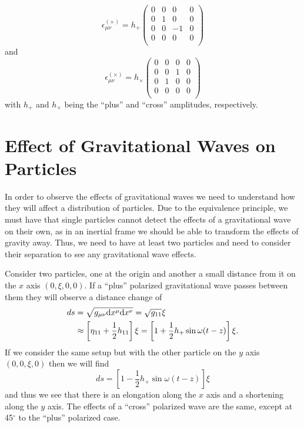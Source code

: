 \begin{equation} \label{epsilonplus}
	\epsilon^{(+)}_{\mu \nu} = h_{+}
	\begin{pmatrix}
	0 & 0 & 0 & 0 \\
	0 & 1 & 0 & 0 \\
	0 & 0 & -1 & 0 \\
	0 & 0 & 0 & 0 \\
	\end{pmatrix}
\end{equation}
and
\begin{equation} \label{epsilontimes}
	\epsilon^{(\times)}_{\mu \nu} = h_{\times}
	\begin{pmatrix}
	0 & 0 & 0 & 0 \\
	0 & 0 & 1 & 0 \\
	0 & 1 & 0 & 0 \\
	0 & 0 & 0 & 0 \\
	\end{pmatrix}
\end{equation}
with \(h_{+}\) and \(h_{\times}\) being the ``plus'' and ``cross'' amplitudes, respectively.

\section{Effect of Gravitational Waves on Particles}

In order to observe the effects of gravitational waves we need to understand how they will affect a distribution of particles. Due to the equivalence principle, we must have that single particles cannot detect the effects of a gravitational wave on their own, as in an inertial frame we should be able to transform the effects of gravity away. Thus, we need to have at least two particles and need to consider their separation to see any gravitational wave effects.

Consider two particles, one at the origin and another a small distance from it on the \(x\) axis \((0,\xi,0,0)\). If a ``plus'' polarized gravitational wave passes between them they will observe a distance change of \cite{cheng}
\begin{equation} \label{particles-distance}
	\begin{aligned}
	ds &= \sqrt{g_{\mu \nu} \text{d}x^{\mu} \text{d}x^{\nu}} = \sqrt{g_{11}} \xi \\
	&\approx \left[ \eta_{11} + \frac{1}{2} h_{11} \right] \xi = \left[ 1 + \frac{1}{2} h_{+} \sin \omega (t - z)\right] \xi .
	\end{aligned}
\end{equation} 
If we consider the same setup but with the other particle on the \(y\) axis \((0, 0 , \xi, 0)\) then we will find
\begin{equation}
	ds = \left [ 1 - \frac{1}{2} h_{+} \sin \omega (t - z)\right] \xi
\end{equation}
and thus we see that there is an elongation along the \(x\) axis and a shortening along the \(y\) axis. The effects of a ``cross'' polarized wave are the same, except at 45\(^{\circ}\) to the ``plus'' polarized case.